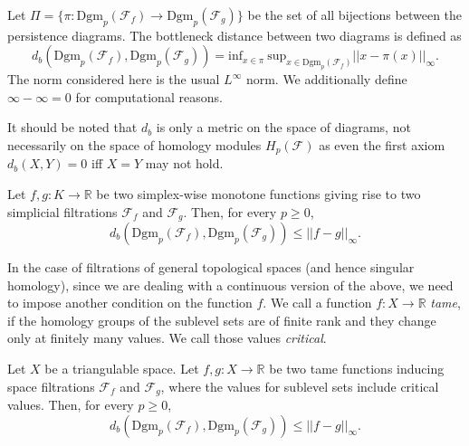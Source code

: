 \begin{definition}
  Let $\Pi = \{\pi: \text{Dgm}_{p}(\mathcal{F}_{f}) \to \text{Dgm}_{p}(\mathcal{F}_{g})\}$ be the set of all bijections between the persistence diagrams. The bottleneck distance between two diagrams is defined as
  \begin{equation*}
    d_{b}(\text{Dgm}_{p}(\mathcal{F}_{f}), \text{Dgm}_{p}(\mathcal{F}_{g})) = \text{inf}_{x \in \pi} \: \text{sup}_{x \in \text{Dgm}_{p}(\mathcal{F}_{f})} || x - \pi(x)||_{\infty}.
  \end{equation*}
The norm considered here is the usual $L^{\infty}$ norm. We additionally define $\infty - \infty = 0$ for computational reasons.
\end{definition}

It should be noted that $d_{b}$ is only a metric on the space of diagrams, not necessarily on the space of homology modules $H_{p}(\mathcal{F})$ as even the first axiom $d_{b}(X,Y) = 0$ iff $X = Y$ may not hold.

\begin{theorem}
  Let $f,g: K \to \mathbb{R}$ be two simplex-wise monotone functions giving rise to two simplicial filtrations $\mathcal{F}_{f}$ and $\mathcal{F}_{g}$. Then, for every $p \geq 0$,
  \begin{equation*}
    d_{b}(\text{Dgm}_{p}(\mathcal{F}_{f}), \text{Dgm}_{p}(\mathcal{F}_{g})) \leq ||f - g||_{\infty}.
  \end{equation*}
\end{theorem}

In the case of filtrations of general topological spaces (and hence singular homology), since we are dealing with a continuous version of the above, we need to impose another condition on the function $f$. We call a function $f:X \to \mathbb{R}$ \textit{tame}, if the homology groups of the sublevel sets are of finite rank and they change only at finitely many values. We call those values \textit{critical}.

\begin{theorem}
  Let $X$ be a triangulable space. Let $f,g: X \to \mathbb{R}$ be two tame functions inducing space filtrations $\mathcal{F}_{f}$ and $\mathcal{F}_{g}$, where the values for sublevel sets include critical values. Then, for every $p \geq 0$,
  \begin{equation*}
    d_{b}(\text{Dgm}_{p}(\mathcal{F}_{f}), \text{Dgm}_{p}(\mathcal{F}_{g})) \leq ||f - g||_{\infty}.
  \end{equation*}
\end{theorem}

